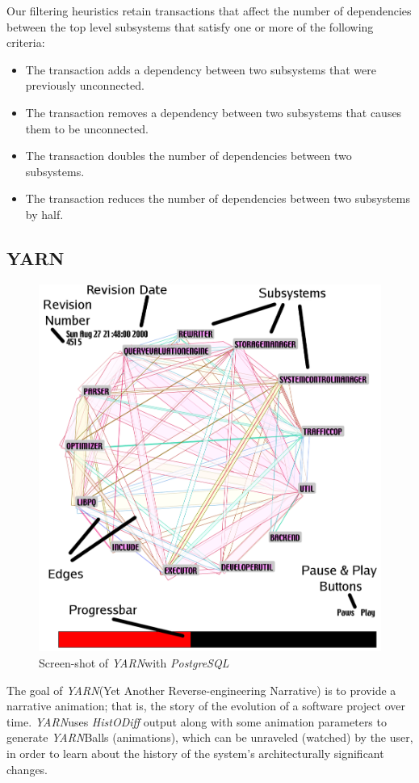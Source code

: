 \documentclass[times, 10pt,twocolumn]{article}
\newcommand{\yarn}{\emph{YARN\xspace}}
\newcommand{\YARN}{\yarn}
\newcommand{\postgresql}{\emph{PostgreSQL}\xspace}
\newcommand{\Subsection}[1]{\subsection{#1}}
\newcommand{\shtn}{\vspace*{-.5em}}
\begin{document}
Our filtering heuristics retain transactions that affect the number
of dependencies between the top level subsystems that satisfy one or
more of the following criteria:

\begin{itemize}
\shtn
\item 
 The transaction adds a dependency between two subsystems that were 
    previously unconnected.

\item 
The transaction removes a dependency between two subsystems that
    causes them to be unconnected.

\item 
The transaction doubles the number of dependencies between two subsystems.

\item 
The transaction reduces the number of dependencies between two
    subsystems by half.
\shtn
\end{itemize}


\shtn
\Subsection{YARN}
\shtn




\begin{figure}[htb]
  \centering
\includegraphics[width=.5\textwidth]{evoflash}
\caption{Screen-shot of \YARN with \postgresql}
\label{fig:evoscreen}
\end{figure}

The goal of \yarn (Yet Another Reverse-engineering Narrative) is to
provide a narrative animation; that is, the story of the evolution of
a software project over time.  \yarn uses \emph{HistODiff} output along with
some animation parameters to generate \yarn Balls
(animations), which can be unraveled (watched) by the user, in order
to learn about the history of the system's architecturally significant
changes.
\end{document}
